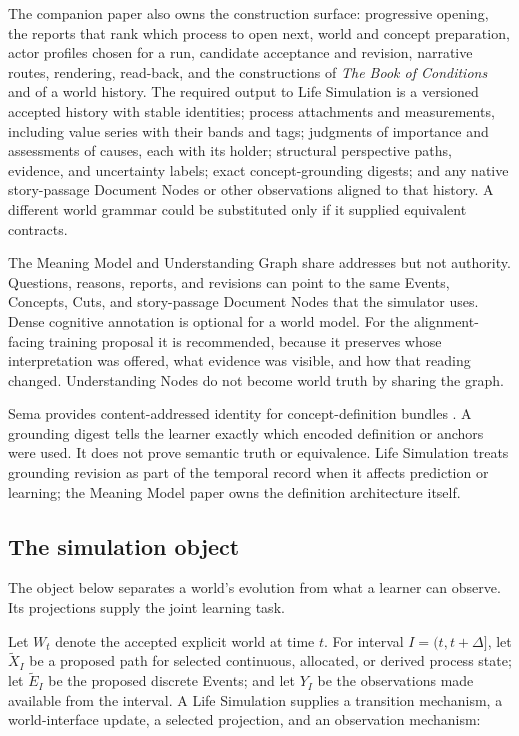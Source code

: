 \documentclass[10pt]{article}
\newcommand{\Book}{\textit{The Book of Conditions}}
\begin{document}
The companion paper also owns the construction surface: progressive opening,
the reports that rank which process to open next, world and concept
preparation, actor profiles chosen for a run, candidate acceptance and
revision, narrative routes, rendering, read-back, and the constructions of
\Book{} and of a world history. The required output to Life Simulation is a
versioned accepted history with stable identities; process attachments and
measurements, including value series with their bands and tags; judgments of
importance and assessments of causes, each with its holder; structural
perspective paths, evidence, and uncertainty labels; exact concept-grounding
digests; and any native story-passage Document Nodes or other observations
aligned to that history. A different
world grammar could be substituted only if it supplied equivalent contracts.

The Meaning Model and Understanding Graph share addresses but not authority.
Questions, reasons, reports, and revisions can point to the same Events,
Concepts, Cuts, and story-passage Document Nodes that the simulator uses. Dense cognitive
annotation is optional for a world model. For the alignment-facing training
proposal it is recommended, because it preserves whose interpretation was
offered, what evidence was visible, and how that reading changed. Understanding Nodes
do not become world truth by sharing the graph.

Sema provides content-addressed identity for concept-definition bundles
\cite{westerbergSema2026}. A grounding digest tells the learner exactly which
encoded definition or anchors were used. It does not prove semantic truth or
equivalence. Life Simulation treats grounding revision as part of the temporal
record when it affects prediction or learning; the Meaning Model paper owns the
definition architecture itself.

\subsection{The simulation object}

The object below separates a world's evolution from what a learner can
observe. Its projections supply the joint learning task.

Let $W_t$ denote the accepted explicit world at time $t$. For interval
$I=(t,t+\Delta]$, let $\widetilde X_I$ be a proposed path for selected
continuous, allocated, or derived process state; let $\widetilde E_I$ be the
proposed discrete Events; and let $Y_I$ be the observations made available from
the interval. A Life Simulation supplies a transition mechanism, a
world-interface update, a selected projection, and an observation mechanism:
\end{document}
